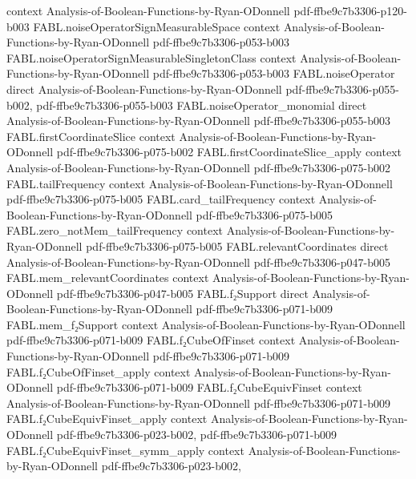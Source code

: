 \begin{theorem}
  {context}
  {Analysis-of-Boolean-Functions-by-Ryan-ODonnell}
  {pdf-ffbe9c7b3306-p120-b003}
\proofstep
  {FABL.noiseOperatorSignMeasurableSpace}
  {context}
  {Analysis-of-Boolean-Functions-by-Ryan-ODonnell}
  {pdf-ffbe9c7b3306-p053-b003}
\proofstep
  {FABL.noiseOperatorSignMeasurableSingletonClass}
  {context}
  {Analysis-of-Boolean-Functions-by-Ryan-ODonnell}
  {pdf-ffbe9c7b3306-p053-b003}
\proofstep
  {FABL.noiseOperator}
  {direct}
  {Analysis-of-Boolean-Functions-by-Ryan-ODonnell}
  {pdf-ffbe9c7b3306-p055-b002,
    pdf-ffbe9c7b3306-p055-b003}
\proofstep
  {FABL.noiseOperator_monomial}
  {direct}
  {Analysis-of-Boolean-Functions-by-Ryan-ODonnell}
  {pdf-ffbe9c7b3306-p055-b003}
\proofstep
  {FABL.firstCoordinateSlice}
  {context}
  {Analysis-of-Boolean-Functions-by-Ryan-ODonnell}
  {pdf-ffbe9c7b3306-p075-b002}
\proofstep
  {FABL.firstCoordinateSlice_apply}
  {context}
  {Analysis-of-Boolean-Functions-by-Ryan-ODonnell}
  {pdf-ffbe9c7b3306-p075-b002}
\proofstep
  {FABL.tailFrequency}
  {context}
  {Analysis-of-Boolean-Functions-by-Ryan-ODonnell}
  {pdf-ffbe9c7b3306-p075-b005}
\proofstep
  {FABL.card_tailFrequency}
  {context}
  {Analysis-of-Boolean-Functions-by-Ryan-ODonnell}
  {pdf-ffbe9c7b3306-p075-b005}
\proofstep
  {FABL.zero_notMem_tailFrequency}
  {context}
  {Analysis-of-Boolean-Functions-by-Ryan-ODonnell}
  {pdf-ffbe9c7b3306-p075-b005}
\proofstep
  {FABL.relevantCoordinates}
  {direct}
  {Analysis-of-Boolean-Functions-by-Ryan-ODonnell}
  {pdf-ffbe9c7b3306-p047-b005}
\proofstep
  {FABL.mem_relevantCoordinates}
  {context}
  {Analysis-of-Boolean-Functions-by-Ryan-ODonnell}
  {pdf-ffbe9c7b3306-p047-b005}
\proofstep
  {FABL.f₂Support}
  {direct}
  {Analysis-of-Boolean-Functions-by-Ryan-ODonnell}
  {pdf-ffbe9c7b3306-p071-b009}
\proofstep
  {FABL.mem_f₂Support}
  {context}
  {Analysis-of-Boolean-Functions-by-Ryan-ODonnell}
  {pdf-ffbe9c7b3306-p071-b009}
\proofstep
  {FABL.f₂CubeOfFinset}
  {context}
  {Analysis-of-Boolean-Functions-by-Ryan-ODonnell}
  {pdf-ffbe9c7b3306-p071-b009}
\proofstep
  {FABL.f₂CubeOfFinset_apply}
  {context}
  {Analysis-of-Boolean-Functions-by-Ryan-ODonnell}
  {pdf-ffbe9c7b3306-p071-b009}
\proofstep
  {FABL.f₂CubeEquivFinset}
  {context}
  {Analysis-of-Boolean-Functions-by-Ryan-ODonnell}
  {pdf-ffbe9c7b3306-p071-b009}
\proofstep
  {FABL.f₂CubeEquivFinset_apply}
  {context}
  {Analysis-of-Boolean-Functions-by-Ryan-ODonnell}
  {pdf-ffbe9c7b3306-p023-b002,
    pdf-ffbe9c7b3306-p071-b009}
\proofstep
  {FABL.f₂CubeEquivFinset_symm_apply}
  {context}
  {Analysis-of-Boolean-Functions-by-Ryan-ODonnell}
  {pdf-ffbe9c7b3306-p023-b002,
}
\end{theorem}
